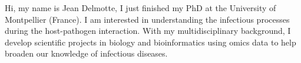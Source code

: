 

\begin{cvparagraph}

Hi, my name is Jean Delmotte, I just finished my PhD at the University of Montpellier (France). I am interested in understanding the infectious processes during the host-pathogen interaction. With my multidisciplinary background, I develop scientific projects in biology and bioinformatics using omics data to help broaden our knowledge of infectious diseases. 
\end{cvparagraph}
